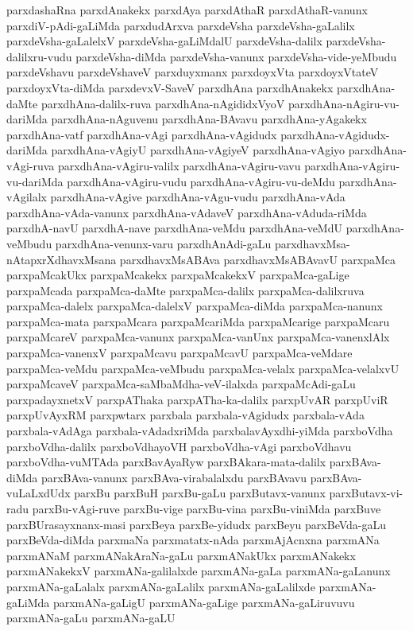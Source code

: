{parxdashaRna
parxdAnakekx
parxdAya
parxdAthaR
parxdAthaR-vanunx
parxdiV-pAdi-gaLiMda
parxdudArxva
parxdeVsha
parxdeVsha-gaLalilx
parxdeVsha-gaLalelxV
parxdeVsha-gaLiMdalU
parxdeVsha-dalilx
parxdeVsha-dalilxru-vudu
parxdeVsha-diMda
parxdeVsha-vanunx
parxdeVsha-vide-yeMbudu
parxdeVshavu
parxdeVshaveV
parxduyxmanx
parxdoyxVta
parxdoyxVtateV
parxdoyxVta-diMda
parxdevxV-SaveV
parxdhAna
parxdhAnakekx
parxdhAna-daMte
parxdhAna-dalilx-ruva
parxdhAna-nAgididxVyoV
parxdhAna-nAgiru-vu-dariMda
parxdhAna-nAguvenu
parxdhAna-BAvavu
parxdhAna-yAgakekx
parxdhAna-vatf
parxdhAna-vAgi
parxdhAna-vAgidudx
parxdhAna-vAgidudx-dariMda
parxdhAna-vAgiyU
parxdhAna-vAgiyeV
parxdhAna-vAgiyo
parxdhAna-vAgi-ruva
parxdhAna-vAgiru-valilx
parxdhAna-vAgiru-vavu
parxdhAna-vAgiru-vu-dariMda
parxdhAna-vAgiru-vudu
parxdhAna-vAgiru-vu-deMdu
parxdhAna-vAgilalx
parxdhAna-vAgive
parxdhAna-vAgu-vudu
parxdhAna-vAda
parxdhAna-vAda-vanunx
parxdhAna-vAdaveV
parxdhAna-vAduda-riMda
parxdhA-navU
parxdhA-nave
parxdhAna-veMdu
parxdhAna-veMdU
parxdhAna-veMbudu
parxdhAna-venunx-varu
parxdhAnAdi-gaLu
parxdhavxMsa-nAtapxrXdhavxMsana
parxdhavxMsABAva
parxdhavxMsABAvavU
parxpaMca
parxpaMcakUkx
parxpaMcakekx
parxpaMcakekxV
parxpaMca-gaLige
parxpaMcada
parxpaMca-daMte
parxpaMca-dalilx
parxpaMca-dalilxruva
parxpaMca-dalelx
parxpaMca-dalelxV
parxpaMca-diMda
parxpaMca-nanunx
parxpaMca-mata
parxpaMcara
parxpaMcariMda
parxpaMcarige
parxpaMcaru
parxpaMcareV
parxpaMca-vanunx
parxpaMca-vanUnx
parxpaMca-vanenxlAlx
parxpaMca-vanenxV
parxpaMcavu
parxpaMcavU
parxpaMca-veMdare
parxpaMca-veMdu
parxpaMca-veMbudu
parxpaMca-velalx
parxpaMca-velalxvU
parxpaMcaveV
parxpaMca-saMbaMdha-veV-ilalxda
parxpaMcAdi-gaLu
parxpadayxnetxV
parxpAThaka
parxpATha-ka-dalilx
parxpUvAR
parxpUviR
parxpUvAyxRM
parxpwtarx
parxbala
parxbala-vAgidudx
parxbala-vAda
parxbala-vAdAga
parxbala-vAdadxriMda
parxbalavAyxdhi-yiMda
parxboVdha
parxboVdha-dalilx
parxboVdhayoVH
parxboVdha-vAgi
parxboVdhavu
parxboVdha-vuMTAda
parxBavAyaRyw
parxBAkara-mata-dalilx
parxBAva-diMda
parxBAva-vanunx
parxBAva-virabalalxdu
parxBAvavu
parxBAva-vuLaLxdUdx
parxBu
parxBuH
parxBu-gaLu
parxButavx-vanunx
parxButavx-vi-radu
parxBu-vAgi-ruve
parxBu-vige
parxBu-vina
parxBu-viniMda
parxBuve
parxBUrasayxnanx-masi
parxBeya
parxBe-yidudx
parxBeyu
parxBeVda-gaLu
parxBeVda-diMda
parxmaNa
parxmatatx-nAda
parxmAjAcnxna
parxmANa
parxmANaM
parxmANakAraNa-gaLu
parxmANakUkx
parxmANakekx
parxmANakekxV
parxmANa-galilalxde
parxmANa-gaLa
parxmANa-gaLanunx
parxmANa-gaLalalx
parxmANa-gaLalilx
parxmANa-gaLalilxde
parxmANa-gaLiMda
parxmANa-gaLigU
parxmANa-gaLige
parxmANa-gaLiruvuvu
parxmANa-gaLu
parxmANa-gaLU
}
